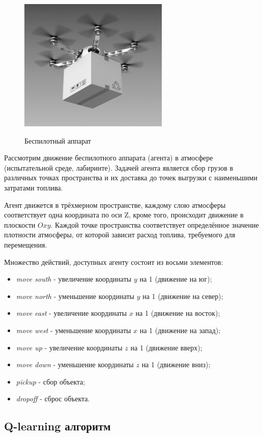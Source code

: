 \documentclass[a4paper]{report}
\theoremstyle{definition}
\theoremstyle{plain}
\theoremstyle{remark}
\theoremstyle{remark}
\theoremstyle{definition}
\begin{document}
\begin{figure}[H]
	{\includegraphics[scale = 0.6]{dronebw.jpg}}
	\caption{Беспилотный аппарат}
\end{figure}

Рассмотрим движение беспилотного аппарата (агента) в атмосфере (испытательной среде, лабиринте). Задачей агента является сбор грузов в различных точках пространства и их доставка до точек выгрузки с наименьшими затратами топлива.

Агент движется в трёхмерном пространстве, каждому слою атмосферы соответствует одна координата по оси Z, кроме того, происходит движение в плоскости $Oxy$. Каждой точке пространства соответствует определённое значение плотности атмосферы, от которой зависит расход топлива, требуемого для перемещения.

Множество действий, доступных агенту состоит из восьми элементов:
\begin{itemize}
  	\item \textit{move south} - увеличение координаты $y$ на 1 (движение на юг);
	\item \textit{move north} - уменьшение координаты $y$ на 1 (движение на север);
	\item \textit{move east} - увеличение координаты $x$ на 1 (движение на восток);
	\item \textit{move west} - уменьшение координаты $x$ на 1 (движение на запад);
	\item \textit{move up} - увеличение координаты $z$ на 1 (движение вверх);
	\item \textit{move down} - уменьшение координаты $z$ на 1 (движение вниз);
	\item \textit{pickup} - сбор объекта;
	\item \textit{dropoff} - сброс объекта.	
\end{itemize}


\newpage
\begin{center}
\section{Q-learning алгоритм}
\end{center}
\end{document}

